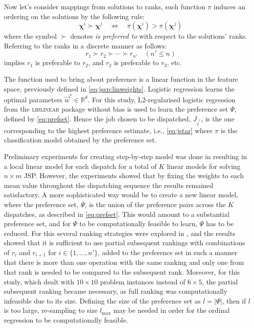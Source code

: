 \documentclass[twocolumn]{svjour3}
\newcommand{\vphi}{\bm{\phi}}
\newcommand{\vchi}{\bm \chi}
\newcommand{\abs}[1]{\lvert#1\rvert}
\begin{document}
Now let's consider mappings from solutions to ranks, such 
function $\pi$ induces an ordering on the solutions by the following rule:
\begin{equation}\quad
\vchi^i \succ \vchi^j \quad \iff \quad \pi(\vchi^i) > 
\pi(\vchi^j)
\end{equation}
where the symbol $\succ$ denotes \emph{is preferred to} with respect to the 
solutions' ranks. Referring to the ranks in a discrete  manner as follows:
\begin{equation}\quad\label{eq:rankorder}
r_1 \succ r_2 \succ \cdots \succ r_{n'} \quad (n' \leq n)
\end{equation}
implies $r_1$ is preferable to $r_2$, and $r_2$ is preferable to $r_3$, etc. 

The function used to bring about preference is a linear function in the feature 
space, previously defined in \cref{eq:jssp:linweights}.
Logistic regression learns the optimal parameters $\vec{w}^*\in\mathbb{R}^d$. 
For this study, L2-regularised logistic regression from the \textsc{liblinear} 
package \cite{liblinear} without bias is used to learn the preference set 
$\Psi$, defined by \cref{eq:prefset}.
Hence the job chosen to be dispatched, $J_{j^*}$, is the one corresponding to 
the highest preference estimate, i.e., \cref{eq:jstar} where $\pi$ is 
the classification model obtained by the preference set.

Preliminary experiments for creating step-by-step model was done in 
\cite{InRu11a} resulting in a local linear model for each dispatch for a total 
of $K$ linear models for solving $n\times m$ JSP. 
However, the experiments showed that by fixing the weights to each mean 
value throughout the dispatching sequence the results remained satisfactory.
A more sophisticated way would be to create a new linear model, where 
the preference set, $\Psi$, is the union of the preference pairs across the 
$K$ dispatches, as described in \cref{eq:prefset}. 
This would amount to a substantial preference set, and for $\Psi$ to be 
computationally feasible to learn, $\Psi$ has to be reduced. For this several 
ranking strategies were explored in \cite{InRu15a}, and the results showed 
that it is sufficient to use partial subsequent rankings with combinations 
of $r_i$ and $r_{i+1}$ for $i\in\{1,\ldots,n'\}$, added to the preference 
set in such a manner that there is more than one 
operation with the same ranking and only one from that rank is needed to be 
compared to the subsequent rank. 
Moreover, for this study, which dealt with $10\times 10$ problem instances 
instead of $6\times5$, the partial subsequent ranking became necessary, as 
full ranking was computationally infeasible due to its size. 
Defining the size of the preference set as $l=\abs{\Psi}$, then if $l$ is too 
large, re-sampling to size $l_{\max}$ may be needed in order for the 
ordinal regression to be computationally feasible. 
\end{document}
